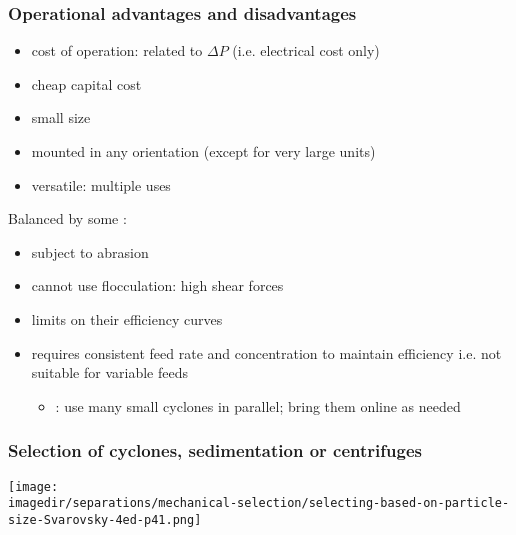 \begin{frame}\frametitle{Operational advantages and disadvantages}
	{\color{myGreen}{Advantages}}
	\begin{itemize}
		\item	cost of operation: related to $\Delta P$ (i.e. electrical cost only)
		\item	cheap capital cost
		\item	small size
		\item	mounted in any orientation (except for very large units)
		\item	versatile: multiple uses
	\end{itemize}
	
	Balanced by some {\color{myOrange}{disadvantages}}:
	\begin{itemize}
		\item	subject to abrasion
		\item	cannot use flocculation: high shear forces
		\item	limits on their efficiency curves
		\item	requires consistent feed rate and concentration to maintain efficiency i.e. not suitable for variable feeds
		\begin{itemize}
			\item	{\color{myBlue}{counteract}}: use many small cyclones in parallel; bring them online as needed
		\end{itemize}
	\end{itemize}	
\end{frame}

\begin{frame}\frametitle{Selection of cyclones, sedimentation or centrifuges}
	\begin{center}
		\texttt{[image: \\imagedir/separations/mechanical-selection/selecting-based-on-particle-size-Svarovsky-4ed-p41.png]}
	\end{center}
\end{frame}

